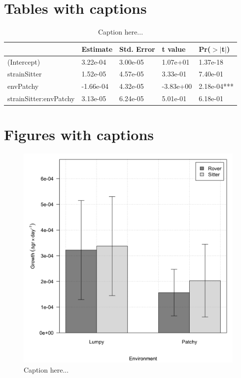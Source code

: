 \documentclass[12pt]{article}
\begin{document}
\begin{singlespace}

\section*{\normalsize Tables with captions}

\begin{table}[ht]
\centering
\caption{Caption here...} 
\begin{tabular}{lllll}
  \hline
 & Estimate & Std. Error & t value & Pr($>$$|$t$|$) \\ 
  \hline
(Intercept) & 3.22e-04 & 3.00e-05 & 1.07e+01 & 1.37e-18 \\ 
  strainSitter & 1.52e-05 & 4.57e-05 & 3.33e-01 & 7.40e-01 \\ 
  envPatchy & -1.66e-04 & 4.32e-05 & -3.83e+00 & 2.18e-04*** \\ 
  strainSitter:envPatchy & 3.13e-05 & 6.24e-05 & 5.01e-01 & 6.18e-01 \\ 
   \hline
\end{tabular}
\label{tab:2}
\end{table}
\newpage

\section*{\normalsize Figures with captions}

\begin{figure}[!htb]
\includegraphics[scale=0.20]{imgs/figure2.png}
\caption{Caption here...}
\label{fig:2}
\end{figure}


\end{singlespace}
\end{document}
